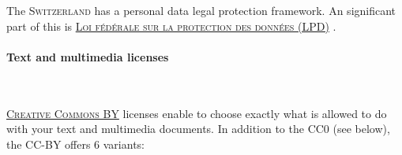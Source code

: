 \vspace{0.4cm}

\noindent {} The \textsc{Switzerland} has a personal data legal protection framework. An significant part of this is \textsc{\href{https://www.admin.ch/opc/fr/classified-compilation/19920153/}{Loi fédérale sur la protection des données (LPD)}} \cite{admin.ch_rs_1992} .


\paragraph{Text and multimedia licenses}

~

\noindent {} \textsc{\href{https://creativecommons.org/}{Creative Commons BY}} licenses enable to choose exactly what is allowed to do with your text and multimedia documents. In addition to the CC0 (see below), the CC-BY offers 6 variants\cite{creativecommons.org_creative_2015}:
